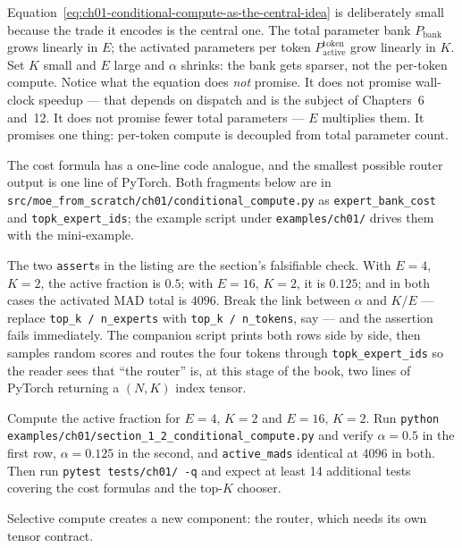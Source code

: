 

Equation~\ref{eq:ch01-conditional-compute-as-the-central-idea} is deliberately small because the trade it encodes is the central one. The total parameter bank $P_{\text{bank}}$ grows linearly in $E$; the activated parameters per token $P^{\text{token}}_{\text{active}}$ grow linearly in $K$. Set $K$ small and $E$ large and $\alpha$ shrinks: the bank gets sparser, not the per-token compute. Notice what the equation does \emph{not} promise. It does not promise wall-clock speedup --- that depends on dispatch and is the subject of Chapters~6 and~12. It does not promise fewer total parameters --- $E$ multiplies them. It promises one thing: per-token compute is decoupled from total parameter count.

The cost formula has a one-line code analogue, and the smallest possible router output is one line of PyTorch. Both fragments below are in \texttt{src/moe\_from\_scratch/ch01/conditional\_compute.py} as \texttt{expert\_bank\_cost} and \texttt{topk\_expert\_ids}; the example script under \texttt{examples/ch01/} drives them with the mini-example.



The two \texttt{assert}s in the listing are the section's falsifiable check. With $E = 4$, $K = 2$, the active fraction is $0.5$; with $E = 16$, $K = 2$, it is $0.125$; and in both cases the activated MAD total is $4096$. Break the link between $\alpha$ and $K/E$ --- replace \texttt{top\_k / n\_experts} with \texttt{top\_k / n\_tokens}, say --- and the assertion fails immediately. The companion script prints both rows side by side, then samples random scores and routes the four tokens through \texttt{topk\_expert\_ids} so the reader sees that ``the router'' is, at this stage of the book, two lines of PyTorch returning a $(N, K)$ index tensor.

\begin{checkpointbox}
Compute the active fraction for $E = 4,\,K = 2$ and $E = 16,\,K = 2$. Run \texttt{python examples/ch01/section\_1\_2\_conditional\_compute.py} and verify $\alpha = 0.5$ in the first row, $\alpha = 0.125$ in the second, and \texttt{active\_mads} identical at $4096$ in both. Then run \texttt{pytest tests/ch01/ -q} and expect at least 14 additional tests covering the cost formulas and the top-$K$ chooser.
\end{checkpointbox}

Selective compute creates a new component: the router, which needs its own tensor contract.
